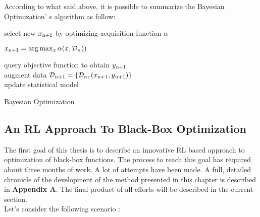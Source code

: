 According to what said above, it is possible to summarize the Bayesian Optimization' s algorithm as follow:

\begin{algorithm} [h!]
	
	{select new $x\textsubscript{n+1}$ by optimizing acquisition function $\alpha$ \\
		
		\begin{center}
			$x\textsubscript{n+1} = \arg \max_{x} \alpha(x, \mathcal{D}_n))$
		\end{center} 
	
	query objective function to obtain $y\textsubscript{n+1}$ \\
	augment data $\mathcal{D}\textsubscript{n+1} = \{\mathcal{D}_n, (x\textsubscript{n+1}, y\textsubscript{n+1})\}$ \\
	update statistical model 
	} 
	\caption{Bayesian Optimization\cite{DBLP:journals/pieee/ShahriariSWAF16}} 
	\label{BayAlgo}
\end{algorithm}

\subsection{An RL Approach To Black-Box Optimization} The first goal of this thesis is to describe an innovative RL based approach to optimization of black-box functions. The process to reach this goal has required about three months of work. A lot of attempts have been made. A full, detailed chronicle of the development of the method presented in this chapter is described in \textbf{Appendix A}. The final product of all efforts will be described in the current section. \\

Let's consider the following scenario :

